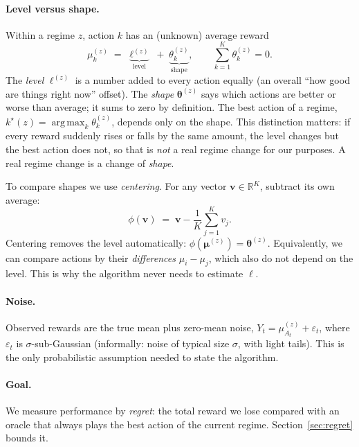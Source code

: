 \documentclass[11pt]{article}
\newcommand{\R}{\mathbb R}
\newcommand{\argmax}{\operatorname*{arg\,max}}
\begin{document}
\paragraph{Level versus shape.}
Within a regime $z$, action $k$ has an (unknown) average reward
\begin{equation}
    \mu_k^{(z)} \;=\; \underbrace{\ell^{(z)}}_{\text{level}} \;+\; \underbrace{\theta_k^{(z)}}_{\text{shape}},
    \qquad \sum_{k=1}^K \theta_k^{(z)} = 0 .
    \label{eq:level-shape}
\end{equation}
The \emph{level} $\ell^{(z)}$ is a number added to every action equally (an overall ``how good
are things right now'' offset). The \emph{shape} $\bm\theta^{(z)}$ says which actions are better
or worse than average; it sums to zero by definition. The best action of a regime,
$k^\star(z)=\argmax_k \theta_k^{(z)}$, depends only on the shape. This distinction matters:
if every reward suddenly rises or falls by the same amount, the level changes but the best
action does not, so that is \emph{not} a real regime change for our purposes. A real regime
change is a change of \emph{shape}.

To compare shapes we use \emph{centering}. For any vector $\bm v\in\R^K$, subtract its own
average:
\begin{equation}
    \phi(\bm v) \;=\; \bm v - \frac1K\sum_{j=1}^K v_j .
\end{equation}
Centering removes the level automatically: $\phi(\bm\mu^{(z)})=\bm\theta^{(z)}$. Equivalently,
we can compare actions by their \emph{differences} $\mu_i-\mu_j$, which also do not depend on the
level. This is why the algorithm never needs to estimate $\ell$.

\paragraph{Noise.}
Observed rewards are the true mean plus zero-mean noise, $Y_t = \mu_{A_t}^{(z)} + \varepsilon_t$,
where $\varepsilon_t$ is $\sigma$-sub-Gaussian (informally: noise of typical size $\sigma$, with
light tails). This is the only probabilistic assumption needed to state the algorithm.

\paragraph{Goal.}
We measure performance by \emph{regret}: the total reward we lose compared with an oracle that
always plays the best action of the current regime. Section~\ref{sec:regret} bounds it.
\end{document}
